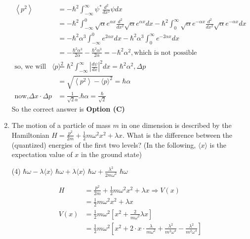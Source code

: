\begin{enumerate}
\begin{answer}
\begin{align*}
\left\langle p^{2}\right\rangle&=-\hbar^{2} \int_{-\infty}^{\infty} \psi^{*} \frac{d^{2}}{d x^{2}} \psi d x\\&=-\hbar^{2} \int_{-\infty}^{0} \sqrt{\alpha} e^{\alpha x} \frac{d^{2}}{d x^{2}} \sqrt{\alpha} e^{\alpha x} d x-\hbar^{2} \int_{0}^{\infty} \sqrt{\alpha} e^{-\alpha x} \frac{d^{2}}{d x^{2}} \sqrt{\alpha} e^{-\alpha x} d x\\
&=-\hbar^{2} \alpha^{3} \int_{-\infty}^{0} e^{2 \alpha x} d x-\hbar^{2} \alpha^{3} \int_{0}^{\infty} e^{-2 \alpha x} d x\\&=-\frac{\hbar^{2} \alpha^{3}}{2 \alpha}-\frac{\hbar^{2} \alpha^{3}}{2 \alpha}=-\hbar^{2} \alpha^{2}, \text{which is not possible}\\
\text{so, we will use the formula }\langle p\rangle^{2}&=\hbar^{2} \int_{-\infty}^{\infty}\left|\frac{d \psi}{d x}\right|^{2} d x=\hbar^{2} \alpha^{2}, \Delta p\\&=\sqrt{\left\langle p^{2}\right\rangle-\langle p\rangle^{2}}=\hbar \alpha\\
\text{now,}\Delta x \cdot \Delta p&=\frac{1}{\sqrt{2} \alpha} . \hbar \alpha=\frac{\hbar}{\sqrt{2}}
\end{align*}
So the correct answer is \textbf{Option (C)}
\end{answer}	
\item The motion of a particle of mass $m$ in one dimension is described by the Hamiltonian $H=\frac{p^{2}}{2 m}+\frac{1}{2} m \omega^{2} x^{2}+\lambda x .$ What is the difference between the (quantized) energies of the first two levels? (In the following, $\langle x\rangle$ is the expectation value of $x$ in the ground state)
{}
\begin{tasks}(4)
\task[\textbf{A.}] $\hbar \omega-\lambda\langle x\rangle$
\task[\textbf{B.}] $\hbar \omega+\lambda\langle x\rangle$
\task[\textbf{C.}] $\hbar \omega+\frac{\lambda^{2}}{2 m \omega^{2}}$
\task[\textbf{D.}] $\hbar \omega$
\end{tasks}
\begin{answer}
\begin{align*}
H&=\frac{p^{2}}{2 m}+\frac{1}{2} m \omega^{2} x^{2}+\lambda x \Rightarrow V(x)\\&=\frac{1}{2} m \omega^{2} x^{2}+\lambda x\\
V(x)&=\frac{1}{2} m \omega^{2}\left[x^{2}+\frac{2}{m \omega^{2}} \lambda x\right]\\&=\frac{1}{2} m \omega^{2}\left[x^{2}+2 \cdot x \cdot \frac{\lambda}{m \omega^{2}}+\frac{\lambda^{2}}{m^{2} \omega^{4}}-\frac{\lambda^{2}}{m^{2} \omega^{4}}\right]\\

\end{align*}
\end{answer}
\end{enumerate}
